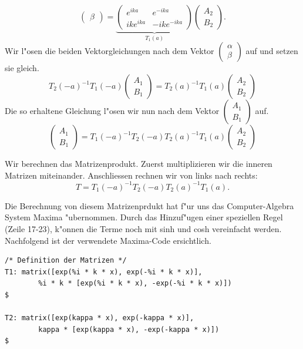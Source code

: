 \begin{refsection}
\[\begin{pmatrix}
\beta
\end{pmatrix}
 = 
\underbrace{
\begin{pmatrix}
e^{ika}
&
e^{-ika}
\\
ike^{ika}
&
-ike^{-ika}
\end{pmatrix}
}_{T_1(a)}
\begin{pmatrix}
A_2
\\
B_2
\end{pmatrix}.
\]
Wir l"osen die beiden Vektorgleichungen nach dem Vektor
$
\begin{pmatrix}
\alpha
\\
\beta
\end{pmatrix}
$
auf und setzen sie gleich.
\[
T_2(-a)^{-1}T_1(-a)
\begin{pmatrix}
A_1
\\
B_1
\end{pmatrix}
=
T_2(a)^{-1}T_1(a)
\begin{pmatrix}
A_2
\\
B_2
\end{pmatrix}
\]
Die so erhaltene Gleichung l"osen wir nun nach dem Vektor
$
\begin{pmatrix}
A_1
\\
B_1
\end{pmatrix}
$
auf.
\[
\begin{pmatrix}
A_1
\\
B_1
\end{pmatrix}
=
T_1(-a)^{-1}T_2(-a)T_2(a)^{-1}T_1(a)
\begin{pmatrix}
A_2
\\
B_2
\end{pmatrix}
\]

Wir berechnen das Matrizenprodukt. 
Zuerst multiplizieren wir die inneren Matrizen miteinander. 
Anschliessen rechnen wir von links nach rechts:
\[
T = T_1(-a)^{-1}T_2(-a)T_2(a)^{-1}T_1(a).
\]

Die Berechnung von diesem Matrizenprdukt hat f"ur uns das Computer-Algebra System Maxima "ubernommen. 
Durch das Hinzuf"ugen einer speziellen Regel (Zeile 17-23), k"onnen die Terme noch mit sinh und cosh vereinfacht werden.
Nachfolgend ist der verwendete Maxima-Code ersichtlich.

\begin{lstlisting}[style=Maxima]
/* Definition der Matrizen */
T1: matrix([exp(%i * k * x), exp(-%i * k * x)],
        %i * k * [exp(%i * k * x), -exp(-%i * k * x)])                      $

T2: matrix([exp(kappa * x), exp(-kappa * x)],
        kappa * [exp(kappa * x), -exp(-kappa * x)])                         $


\end{lstlisting}
\end{refsection}
